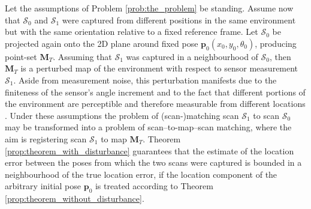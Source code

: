 Let the assumptions of Problem \ref{prob:the_problem} be standing. Assume now
that $\mathcal{S}_0$ and $\mathcal{S}_1$ were captured from different
positions in the same environment but with the same orientation
relative to a fixed reference frame. Let $\mathcal{S}_0$ be projected again onto
the 2D plane around fixed pose $\bm{p}_0(x_0, y_0, \theta_0)$, producing
point-set $\bm{M}_T$. Assuming that $\mathcal{S}_1$ was captured in a
neighbourhood of $\mathcal{S}_0$, then $\bm{M}_T$ is a perturbed map of the
environment with respect to sensor measurement $\mathcal{S}_1$. Aside from
measurement noise, this perturbation manifests due to the finiteness of the
sensor's angle increment and to the fact that different portions of the
environment are perceptible and therefore measurable from different locations
\cite{olson}. Under these assumptions the problem of (scan-)matching scan
$\mathcal{S}_1$ to scan $\mathcal{S}_0$ may be transformed into a problem of
scan--to-map--scan matching, where the aim is registering scan $\mathcal{S}_1$
to map $\bm{M}_T$. Theorem \ref{prop:theorem_with_disturbance} guarantees
that the estimate of the location error between the poses from which the two
scans were captured is bounded in a neighbourhood of the true location error,
if the location component of the arbitrary initial pose $\bm{p}_0$ is treated
according to Theorem \ref{prop:theorem_without_disturbance}.


